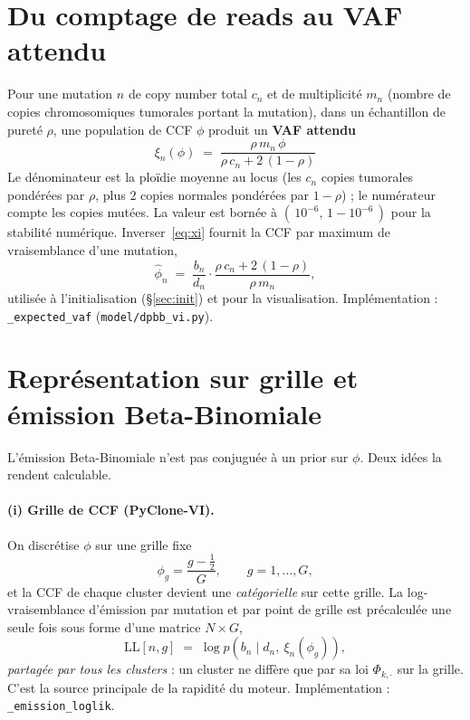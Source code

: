 \documentclass[11pt,a4paper]{article}
\newcommand{\code}[1]{\texttt{#1}}
\newcommand{\half}{\tfrac12}
\theoremstyle{remark}
\begin{document}
\section{Du comptage de reads au VAF attendu}\label{sec:vaf}

Pour une mutation $n$ de copy number total $c_n$ et de multiplicité $m_n$ (nombre de copies
chromosomiques tumorales portant la mutation), dans un échantillon de pureté $\rho$, une
population de CCF $\phi$ produit un \textbf{VAF attendu}
\begin{equation}\label{eq:xi}
\boxed{\;\xi_n(\phi) \;=\; \frac{\rho\,m_n\,\phi}{\rho\,c_n + 2\,(1-\rho)}\;}
\end{equation}
Le dénominateur est la ploïdie moyenne au locus (les $c_n$ copies tumorales pondérées par
$\rho$, plus $2$ copies normales pondérées par $1-\rho$) ; le numérateur compte les copies
mutées. La valeur est bornée à $(\,10^{-6},\,1-10^{-6}\,)$ pour la stabilité numérique.
Inverser~\eqref{eq:xi} fournit la CCF par maximum de vraisemblance d'une mutation,
\begin{equation}\label{eq:phimle}
\hat\phi_n \;=\; \frac{b_n}{d_n}\cdot\frac{\rho\,c_n + 2\,(1-\rho)}{\rho\,m_n},
\end{equation}
utilisée à l'initialisation (\S\ref{sec:init}) et pour la visualisation. Implémentation :
\code{\_expected\_vaf} (\code{model/dpbb\_vi.py}).

\section{Représentation sur grille et émission Beta-Binomiale}

L'émission Beta-Binomiale n'est pas conjuguée à un prior sur $\phi$. Deux idées la rendent
calculable.

\paragraph{(i) Grille de CCF (PyClone-VI).} On discrétise $\phi$ sur une grille fixe
\begin{equation}
\phi_g = \frac{g-\half}{G}, \qquad g=1,\dots,G,
\end{equation}
et la CCF de chaque cluster devient une \emph{catégorielle} sur cette grille. La
log-vraisemblance d'émission par mutation et par point de grille est précalculée une seule
fois sous forme d'une matrice $N\times G$,
\begin{equation}\label{eq:LL}
\mathrm{LL}[n,g] \;=\; \log p\!\left(b_n \mid d_n,\ \xi_n(\phi_g)\right),
\end{equation}
\emph{partagée par tous les clusters} : un cluster ne diffère que par sa loi $\Phi_{k,\cdot}$
sur la grille. C'est la source principale de la rapidité du moteur. Implémentation :
\code{\_emission\_loglik}.
\end{document}
